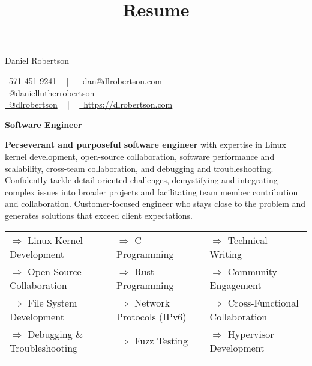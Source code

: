 \documentclass[a4paper,skipsamekey,11pt,english]{curve}
\title{Resume}
\newcommand{\allTheInfo}[3]{
  \begin{center}
    {\Huge\color{red} #1} \hfill {
      \begin{minipage}{3in}
        #2
      \end{minipage}
    }
    \vspace{10pt}
    \begin{tcolorbox}[
      sharp corners,
      boxrule=0mm,
      enhanced,
      borderline north={1pt}{0pt}{blue},
      borderline south={1pt}{0pt}{blue},
      borderline west={0pt}{0pt}{base1!10},
      borderline east={0pt}{0pt}{base1!10},
    ]
      \begin{center}
        \vspace{-5pt}
        \Large{#3}
        \vspace{-5pt}
      \end{center}
    \end{tcolorbox}
  \end{center}
}
\newcommand{\makeSkillRow}[3]{
  {$\Rightarrow$#1} & {$\Rightarrow$#2} & {$\Rightarrow$#3}\\
}
\begin{document}
  \allTheInfo{
    Daniel Robertson
  }{
    \href{tel:5714519241}{
      \raisebox{-0.05\height} \faPhone\ 571-451-9241} ~ | ~
    \href{mailto:dan@dlrobertson.com}{
      \raisebox{-0.15\height} \faEnvelope\ dan@dlrobertson.com}\\
    \href{www.linkedin.com/in/daniellutherrobertson/ }{
      \raisebox{-0.15\height} \faLinkedin\ @daniellutherrobertson }\\
    \href{https://github.com/dlrobertson}{
      \raisebox{-0.15\height} \faGithub\ @dlrobertson} ~ | ~
    \href{https://dlrobertson.com}{
      \raisebox{-0.15\height} \faGlobe\ https://dlrobertson.com}
  }{
    \color{base03}\textbf{Software Engineer}
  }

  \textbf{Perseverant and purposeful software engineer} with expertise in Linux kernel
  development, open-source collaboration, software performance and scalability,
  cross-team collaboration, and debugging and troubleshooting. Confidently
  tackle detail-oriented challenges, demystifying and integrating complex
  issues into broader projects and facilitating team member contribution and
  collaboration. Customer-focused engineer who stays close to the problem and
  generates solutions that exceed client expectations.
  \begin{center}
    \setlength{\tabcolsep}{1em}
    \begin{tabular}{ l l l }
      \makeSkillRow{
        Linux Kernel Development
      }{
        C Programming
      }{
        Technical Writing
      }
      \makeSkillRow{
        Open Source Collaboration
      }{
        Rust Programming
      }{
        Community Engagement
      }
      \makeSkillRow{
        File System Development
      }{
        Network Protocols (IPv6)
      }{
        Cross-Functional Collaboration
      }
      \makeSkillRow{
        Debugging \& Troubleshooting
      }{
        Fuzz Testing
      }{
        Hypervisor Development
      }\\
    \end{tabular}
  \end{center}
\end{document}
